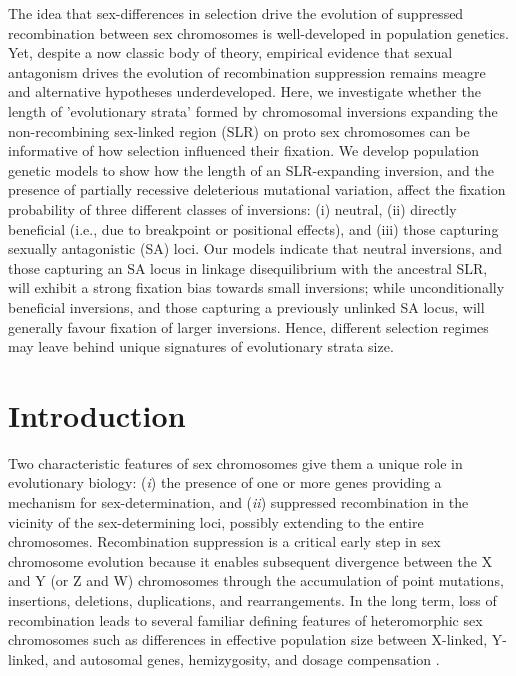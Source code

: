 \documentclass{article}[12pt]
\begin{document}
\noindent The idea that sex-differences in selection drive the evolution of suppressed recombination between sex chromosomes is well-developed in population genetics. Yet, despite a now classic body of theory, empirical evidence that sexual antagonism drives the evolution of recombination suppression remains meagre and alternative hypotheses underdeveloped. Here, we investigate whether the length of 'evolutionary strata' formed by chromosomal inversions expanding the non-recombining sex-linked region (SLR) on proto sex chromosomes can be informative of how selection influenced their fixation. We develop population genetic models to show how the length of an SLR-expanding inversion, and the presence of partially recessive deleterious mutational variation, affect the fixation probability of three different classes of inversions: (i) neutral, (ii) directly beneficial (i.e., due to breakpoint or positional effects), and (iii) those capturing sexually antagonistic (SA) loci. Our models indicate that neutral inversions, and those capturing an SA locus in linkage disequilibrium with the ancestral SLR, will exhibit a strong fixation bias towards small inversions; while unconditionally beneficial inversions, and those capturing a previously unlinked SA locus, will generally favour fixation of larger inversions. Hence, different selection regimes may leave behind unique signatures of evolutionary strata size. 


\newpage{}


\section*{Introduction} \label{sec:Introduction}

Two characteristic features of sex chromosomes give them a unique role in evolutionary biology: ({\itshape i}) the presence of one or more genes providing a mechanism for sex-determination, and ({\itshape ii}) suppressed recombination in the vicinity of the sex-determining loci, possibly extending to the entire chromosomes. Recombination suppression is a critical early step in sex chromosome evolution because it enables subsequent divergence between the X and Y (or Z and W) chromosomes through the accumulation of point mutations, insertions, deletions, duplications, and rearrangements. In the long term, loss of recombination leads to several familiar defining features of heteromorphic sex chromosomes such as differences in effective population size between X-linked, Y-linked, and autosomal genes, hemizygosity, and dosage compensation \citep{CharlesworthMarais2005, BergeroCharlesworth2009,BeukeboomPerrin2014,LenormandRoze2022}.
	
\end{document}
